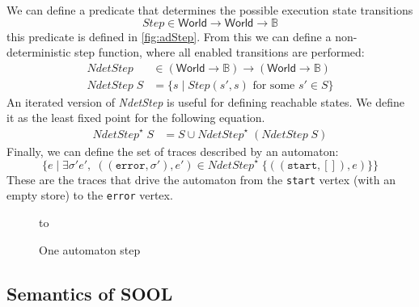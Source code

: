 \documentclass{sigplanconf} %
\newcommand{\B}{\ensuremath{\mathbb{B}}}
\newcommand{\set}[1]{\ensuremath{\mathsf{#1}}}
\theoremstyle{definition}
\theoremstyle{remark}
\begin{document}
We can define a predicate that determines the possible execution state transitions
\[
\mathit{Step}\in\set{World}\to\set{World}\to\B
\]
this predicate is defined in \autoref{fig:adStep}.
From this we can define a non-deterministic step function, where all
enabled transitions are performed:
\begin{align}
\mathit{NdetStep}&\in(\set{World}\to\B)\to(\set{World}\to\B)\\
\mathit{NdetStep}\;S&=\{ s \mid \text{$\mathit{Step}(s', s)$ for some $s'\in S$} \} \label{eq:ndetstep}
\end{align}
An iterated version of \textit{NdetStep} is useful for defining reachable states.
We define it as the least fixed point for the following equation.
\begin{align}
\mathit{NdetStep}^\star\;S &= S \cup \mathit{NdetStep}^\star\;(\mathit{NdetStep}\;S)
\end{align}
Finally, we can define the set of traces described by an automaton:
\[
\{ e \mid
\exists\sigma'e',\;((\mathtt{error},\sigma'),e')\in\mathit{NdetStep}^\star\;\{((\mathtt{start},[]),e)\}
\}
\]
These are the traces that drive the automaton from the \texttt{start} vertex (with an empty store) to the \texttt{error} vertex.
\begin{figure}
\hbox to
\caption{One automaton step}
\label{fig:adStep}
\end{figure}
\subsection{Semantics of SOOL} \label{sec:semantics.sool} %
\end{document}
